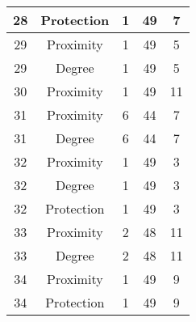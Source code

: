 \documentclass[results.tex]{subfiles}
\begin{document}
\begin{center}
\begin{tabular}{| c || c | c | c | c |}
            \hline
            28                      & Protection                   & 1                      & 49                      & 7                    \\
            \hline
            29                      & Proximity                    & 1                      & 49                      & 5                    \\
            \hline
            29                      & Degree                       & 1                      & 49                      & 5                    \\
            \hline
            30                      & Proximity                    & 1                      & 49                      & 11                   \\
            \hline
            31                      & Proximity                    & 6                      & 44                      & 7                    \\
            \hline
            31                      & Degree                       & 6                      & 44                      & 7                    \\
            \hline
            32                      & Proximity                    & 1                      & 49                      & 3                    \\
            \hline
            32                      & Degree                       & 1                      & 49                      & 3                    \\
            \hline
            32                      & Protection                   & 1                      & 49                      & 3                    \\
            \hline
            33                      & Proximity                    & 2                      & 48                      & 11                   \\
            \hline
            33                      & Degree                       & 2                      & 48                      & 11                   \\
            \hline
            34                      & Proximity                    & 1                      & 49                      & 9                    \\
            \hline
            34                      & Protection                   & 1                      & 49                      & 9                    \\

\end{tabular}
\end{center}
\end{document}
